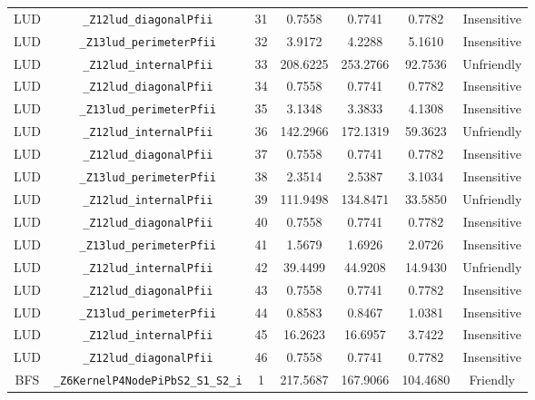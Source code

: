 \documentclass{article}
\begin{document}
\begin{table}[H]
\begin{tabular}{c c c c c c c}
		LUD       & \verb|_Z12lud_diagonalPfii|          & 31  & 0.7558   & 0.7741        & 0.7782         & Insensitive \\
		LUD       & \verb|_Z13lud_perimeterPfii|         & 32  & 3.9172   & 4.2288        & 5.1610         & Insensitive \\
		LUD       & \verb|_Z12lud_internalPfii|          & 33  & 208.6225 & 253.2766      & 92.7536        & Unfriendly  \\
		LUD       & \verb|_Z12lud_diagonalPfii|          & 34  & 0.7558   & 0.7741        & 0.7782         & Insensitive \\
		LUD       & \verb|_Z13lud_perimeterPfii|         & 35  & 3.1348   & 3.3833        & 4.1308         & Insensitive \\
		LUD       & \verb|_Z12lud_internalPfii|          & 36  & 142.2966 & 172.1319      & 59.3623        & Unfriendly  \\
		LUD       & \verb|_Z12lud_diagonalPfii|          & 37  & 0.7558   & 0.7741        & 0.7782         & Insensitive \\
		LUD       & \verb|_Z13lud_perimeterPfii|         & 38  & 2.3514   & 2.5387        & 3.1034         & Insensitive \\
		LUD       & \verb|_Z12lud_internalPfii|          & 39  & 111.9498 & 134.8471      & 33.5850        & Unfriendly  \\
		LUD       & \verb|_Z12lud_diagonalPfii|          & 40  & 0.7558   & 0.7741        & 0.7782         & Insensitive \\
		LUD       & \verb|_Z13lud_perimeterPfii|         & 41  & 1.5679   & 1.6926        & 2.0726         & Insensitive \\
		LUD       & \verb|_Z12lud_internalPfii|          & 42  & 39.4499  & 44.9208       & 14.9430        & Unfriendly  \\
		LUD       & \verb|_Z12lud_diagonalPfii|          & 43  & 0.7558   & 0.7741        & 0.7782         & Insensitive \\
		LUD       & \verb|_Z13lud_perimeterPfii|         & 44  & 0.8583   & 0.8467        & 1.0381         & Insensitive \\
		LUD       & \verb|_Z12lud_internalPfii|          & 45  & 16.2623  & 16.6957       & 3.7422         & Insensitive \\
		LUD       & \verb|_Z12lud_diagonalPfii|          & 46  & 0.7558   & 0.7741        & 0.7782         & Insensitive \\
		BFS       & \verb|_Z6KernelP4NodePiPbS2_S1_S2_i| & 1   & 217.5687 & 167.9066      & 104.4680       & Friendly    \\

\end{tabular}
\end{table}
\end{document}
